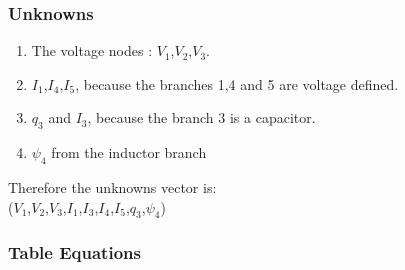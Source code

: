 \subsubsection{Unknowns}
\begin{enumerate}
\item The voltage nodes : $V_{1}$,$V_{2}$,$V_{3}$.
\item $I_{1}$,$I_{4}$,$I_{5}$, because the branches 1,4 and 5 are voltage defined.
\item $q_{3}$ and $I_{3}$, because the branch 3 is a capacitor.
\item $\psi _{4}$ from the inductor branch
\end{enumerate}
Therefore the unknowns vector is:\\
($V_{1}$,$V_{2}$,$V_{3}$,$I_{1}$,$I_{3}$,$I_{4}$,$I_{5}$,$q_{3}$,$\psi _{4}$)
\subsubsection{Table Equations}

